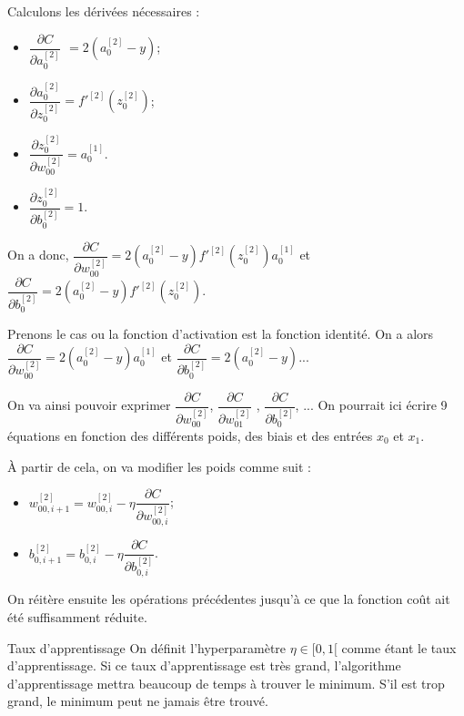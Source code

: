 Calculons les dérivées nécessaires : 
\begin{multicols}{4}
\begin{itemize}
\item $\dfrac{\partial C}{\partial a^{[2]}_{0}}$ $= 2\left( a^{[2]}_{0} - y  \right)$;
\item $ \dfrac{\partial  a^{[2]}_{0}}{\partial z^{[2]}_{0}} = f'^{[2]}\left(z_0^{[2]}\right)$;
\item $\dfrac{\partial z^{[2]}_{0}}{\partial w^{[2]}_{00}}  = a_0^{[1]} $.
\item $\dfrac{\partial z^{[2]}_{0}}{\partial b^{[2]}_{0}} = 1$.
\end{itemize}
\end{multicols}

On a donc, 
$\dfrac{\partial C}{\partial w^{[2]}_{00}} = 2\left( a^{[2]}_{0} - y  \right)  f'^{[2]}\left(z_0^{[2]}\right) a_0^{[1]}$
et 
$\dfrac{\partial C}{\partial b^{[2]}_{0}} = 2\left( a^{[2]}_{0} - y  \right)  f'^{[2]}\left(z_0^{[2]}\right) $.

Prenons le cas ou la fonction d'activation est la fonction identité. 
On a alors
$\dfrac{\partial C}{\partial w^{[2]}_{00}} = 2\left( a^{[2]}_{0} - y  \right)   a_0^{[1]}$
et 
$\dfrac{\partial C}{\partial b^{[2]}_{0}} = 2\left( a^{[2]}_{0} - y  \right)   $...

On va ainsi pouvoir exprimer $\dfrac{\partial C}{\partial w^{[2]}_{00}}$, $\dfrac{\partial C}{\partial w^{[2]}_{01}}$ , $\dfrac{\partial C}{\partial b^{[2]}_{0}}$, ... 
On pourrait ici écrire 9 équations en fonction des différents poids, des biais et des entrées $x_0$ et $x_1$.  

\`A partir de cela, on va modifier les poids comme suit : 
\begin{itemize}
\item $ w^{[2]}_{00,i+1}=w^{[2]}_{00,i}-\eta  \dfrac{\partial C}{\partial w^{[2]}_{00,i}}$;
\item $ b^{[2]}_{0,i+1}=b^{[2]}_{0,i}-\eta  \dfrac{\partial C}{\partial b^{[2]}_{0,i}}$.
\end{itemize}

On réitère ensuite les opérations précédentes jusqu'à ce que la fonction coût ait été suffisamment réduite.

\begin{defi}{Taux d'apprentissage}
On définit l'hyperparamètre $\eta\in[0,1[$ comme étant le taux d'apprentissage. Si ce taux d'apprentissage est très grand, l'algorithme d'apprentissage mettra beaucoup de temps à trouver le minimum. S'il est trop grand, le minimum peut ne jamais être trouvé. 

\end{defi}


